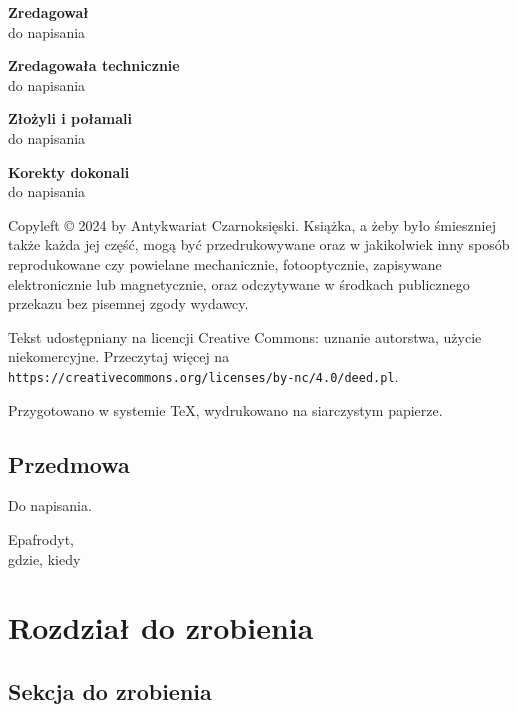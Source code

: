 \documentclass{parchment}
\begin{document}
{\noindent \textbf{Zredagował}\\do napisania} \vspace{5mm}

{\noindent \textbf{Zredagowała technicznie}\\do napisania} \vspace{5mm}

{\noindent \textbf{Złożyli i połamali}\\do napisania} \vspace{5mm}

{\noindent \textbf{Korekty dokonali}\\do napisania} \vfill

{\noindent Copyleft © 2024 by Antykwariat Czarnoksięski.
Książka, a żeby było śmieszniej także każda jej część, mogą być przedrukowywane oraz w jakikolwiek inny sposób reprodukowane czy powielane mechanicznie, fotooptycznie, zapisywane elektronicznie lub magnetycznie, oraz odczytywane w środkach publicznego przekazu bez pisemnej zgody wydawcy.
}

\vspace{5mm}
{
    \noindent
    Tekst udostępniany na licencji Creative Commons: uznanie autorstwa, użycie niekomercyjne. Przeczytaj więcej na \texttt{https://creativecommons.org/licenses/by-nc/4.0/deed.pl}.
}

\vspace{5mm}

{\noindent Przygotowano w systemie \TeX, wydrukowano na siarczystym papierze.}

\newpage
\section*{Przedmowa}
Do napisania.

\begin{flushright}
Epafrodyt,\\gdzie, kiedy
\end{flushright}

\tableofcontents
\cleardoublepage %

\chapter{Rozdział do zrobienia}
\section{Sekcja do zrobienia}



\raggedright
{}
\printindex

\printindex[persons]
\end{document}

